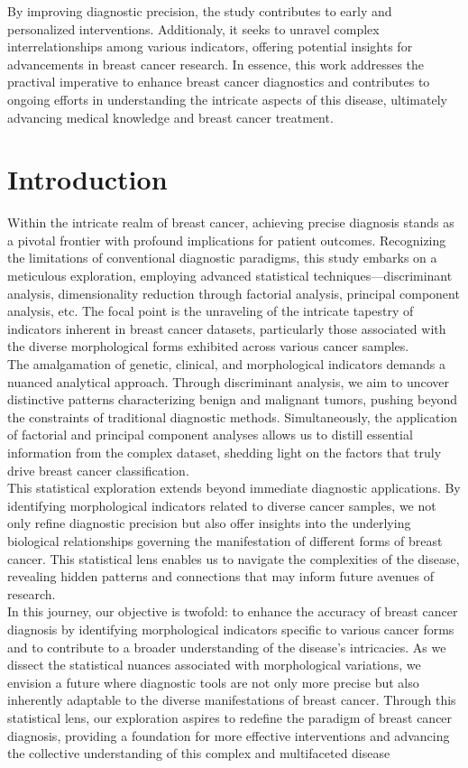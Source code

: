 \documentclass[10pt,a4paper]{article}
\theoremstyle{definition}
\theoremstyle{definition}
\begin{document}
By improving diagnostic precision, the study contributes to early and personalized interventions. Additionaly, it seeks to unravel complex interrelationships among various indicators, offering potential insights for advancements in breast cancer research. In essence, this work addresses the practival imperative to enhance breast cancer diagnostics and contributes to ongoing efforts in understanding the intricate aspects of this disease, ultimately advancing medical knowledge and breast cancer treatment.

\newpage

\section{Introduction}
Within the intricate realm of breast cancer, achieving precise diagnosis stands as a pivotal frontier with profound implications for patient outcomes. Recognizing the limitations of conventional diagnostic paradigms, this study embarks on a meticulous exploration, employing advanced statistical techniques—discriminant analysis, dimensionality reduction through factorial analysis, principal component analysis, etc. The focal point is the unraveling of the intricate tapestry of indicators inherent in breast cancer datasets, particularly those associated with the diverse morphological forms exhibited across various cancer samples. \\

The amalgamation of genetic, clinical, and morphological indicators demands a nuanced analytical approach. Through discriminant analysis, we aim to uncover distinctive patterns characterizing benign and malignant tumors, pushing beyond the constraints of traditional diagnostic methods. Simultaneously, the application of factorial and principal component analyses allows us to distill essential information from the complex dataset, shedding light on the factors that truly drive breast cancer classification. \\

This statistical exploration extends beyond immediate diagnostic applications. By identifying morphological indicators related to diverse cancer samples, we not only refine diagnostic precision but also offer insights into the underlying biological relationships governing the manifestation of different forms of breast cancer. This statistical lens enables us to navigate the complexities of the disease, revealing hidden patterns and connections that may inform future avenues of research. \\

In this journey, our objective is twofold: to enhance the accuracy of breast cancer diagnosis by identifying morphological indicators specific to various cancer forms and to contribute to a broader understanding of the disease's intricacies. As we dissect the statistical nuances associated with morphological variations, we envision a future where diagnostic tools are not only more precise but also inherently adaptable to the diverse manifestations of breast cancer. Through this statistical lens, our exploration aspires to redefine the paradigm of breast cancer diagnosis, providing a foundation for more effective interventions and advancing the collective understanding of this complex and multifaceted disease
\end{document}

